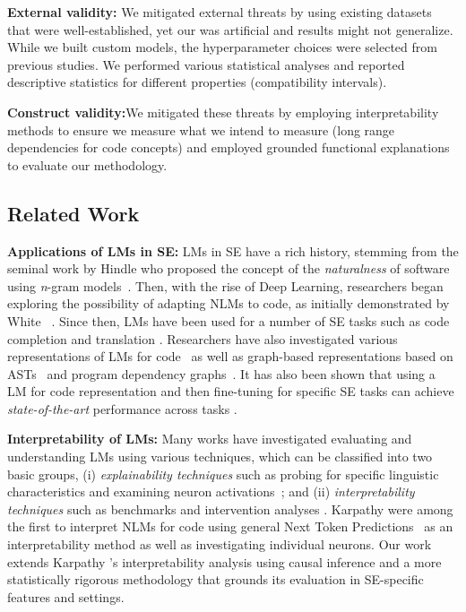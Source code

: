 \noindent\textbf{External validity:} We mitigated external threats by using existing datasets that were well-established, yet our \CommentsTB was artificial and results might not generalize. While we built custom models, the hyperparameter choices were selected from previous studies. We performed various statistical  analyses and reported descriptive statistics for different properties (\ie compatibility intervals).

\noindent\textbf{Construct validity:}We mitigated these threats by employing interpretability methods to ensure we measure what we intend to measure (long range dependencies for code concepts) and employed grounded functional explanations to evaluate our methodology.

\subsection{Related Work}
\label{sub:relwork}

\textbf{Applications of LMs in SE:} LMs in SE have a rich history, stemming from the seminal work by Hindle \etal who proposed the concept of the \textit{naturalness} of software using \textit{n}-gram models~\citep{hindle2012natural}. Then, with the rise of Deep Learning, researchers began exploring the possibility of adapting NLMs to code, as initially demonstrated by White \etal~\cite{White:MSR15}. Since then, LMs have been used for a number of SE tasks such as code completion \citep{Nguyen2013ASS, Raychev2014CodeCW, tu2014local, Hellendoorn2017AreCode, Karampatsis2019,  Karampatsis2020Open-VocabularyAbstract, ciniselli2021empirical, chen2021evaluating} and translation \cite{Chen2019sequencer, Roziere2020transcoder, Hu2018comment, Mastropaolo2021StudyingTasks}. 
Researchers have also investigated various representations of LMs for code~\citep{White2016clones} as well as graph-based representations based on ASTs~\cite{allamanis2018learning} and program dependency graphs~\cite{Nguyen:ICSE15}. It has also been shown that using a LM for code representation and then fine-tuning for specific SE tasks can achieve \textit{state-of-the-art} performance across tasks \citep{Hussain2020DeepTL, feng2020codebert, guo2021graphcodebert}. 

\noindent\textbf{Interpretability of LMs:} Many works have investigated evaluating and understanding LMs using various techniques, which can be classified into two basic groups, (i) \textit{explainability techniques} such as probing for specific linguistic characteristics \citep{tenney2019bert} and examining neuron activations~\citep{dai2021knowledge}; and (ii) \textit{interpretability techniques} such as benchmarks \cite{wang2018glue, rajpurkar2018squad, husain2019codesearchnet, lu2021codexglue, chen2021evaluating} and intervention analyses \citep{khandelwal2018sharp, prabhakaran2019perturbation, ribeiro2020checklist, rabin2021generalizability}. Karpathy \etal were among the first to interpret NLMs for code using general Next Token Predictions~\cite{karpathy2015understand} as an interpretability method as well as investigating individual neurons. Our work extends Karpathy \etal's interpretability analysis using causal inference and a more statistically rigorous methodology that grounds its evaluation in SE-specific features and settings.


